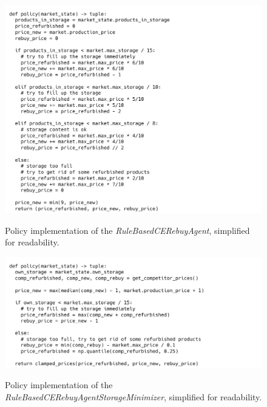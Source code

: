 \begin{figure}[ht]
	\includegraphics[width = \textwidth]{images/policies/RuleBasedCERebuyAgentPolicy.png}\\
	\caption{Policy implementation of the \emph{RuleBasedCERebuyAgent}, simplified for readability.}\label{fig:PolicyRuleBasedCERebuy}
\end{figure}

\begin{figure}[ht]
	\includegraphics[width = \textwidth]{images/policies/RuleBasedCERebuyAgentStorageMinimizerPolicy.png}\\
	\caption{Policy implementation of the \emph{RuleBasedCERebuyAgentStorageMinimizer}, simplified for readability.}\label{fig:PolicyRuleBasedStorageMinimizer}
\end{figure}

